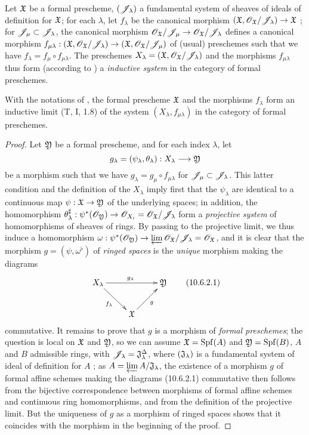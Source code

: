 \begin{env}[10.6.1]
\label{1.10.6.1}
Let $\mathfrak{X}$ be a formal prescheme, $(\mathscr{J}_\lambda)$ a fundamental system of sheaves of ideals of definition for $\mathfrak{X}$; for each $\lambda$, let $f_\lambda$ be the canonical morphism $(\fk{X},\OO_\fk{X}/\sh{J}_\lambda)\to\fk{X}$ ; for $\mathscr{J}_\mu\subset\mathscr{J}_\lambda$, the canonical morphism $\OO_\fk{X}/\sh{J}_\mu\to\OO_\fk{X}/\sh{J}_\lambda$ defines a canonical morphism
$f_{\mu\lambda}:(\fk{X},\OO_\fk{X}/\sh{J}_\lambda)\to(\fk{X},\OO_\fk{X}/\sh{J}_\mu)$ of (usual) preschemes such that we have $f_\lambda=f_\mu\circ f_{\mu\lambda}$.
The preschemes $X_\lambda=(\mathfrak{X},\mathscr{O}_\mathfrak{X}/\mathscr{J}_\lambda)$ and the morphisms $f_{\mu\lambda}$ thus form (according to ) a \emph{inductive system} in the category of formal preschemes.
\end{env}

\begin{prop}[10.6.2]
\label{1.10.6.2}
With the notations of , the formal prescheme $\mathfrak{X}$ and the morphisms $f_\lambda$ form an inductive limit (T, I, 1.8) of the system $(X_\lambda,f_{\mu\lambda})$ in the category of formal preschemes.
\end{prop}

\begin{proof}
\label{proof-1.10.6.2}
Let $\mathfrak{Y}$ be a formal prescheme, and for each index $\lambda$, let
\[
  g_\lambda=(\psi_\lambda,\theta_\lambda):X_\lambda\to\fk{Y}
\]
be a morphism such that we have $g_\lambda=g_\mu\circ f_{\mu\lambda}$ for $\mathscr{J}_\mu\subset\mathscr{J}_\lambda$.
This latter condition and the definition of the $X_\lambda$ imply first that the $\psi_\lambda$ are identical to a continuous map $\psi:\fk{X}\to\fk{Y}$ of the underlying spaces; in addition, the homomorphism $\theta_\lambda^\sharp:\psi^*(\OO_\fk{Y})\to\OO_{X_i}=\OO_\fk{X}/\sh{J}_\lambda$ form a \emph{projective system} of homomorphisms of sheaves of rings.
By passing to the projective limit, we thus induce a homomorphism $\omega:\psi^*(\OO_\fk{Y})\to\varprojlim\OO_\fk{X}/\sh{J}_\lambda=\OO_\fk{X}$, and it is clear that the morphism $g=(\psi,\omega^\flat)$ of \emph{ringed spaces} is the \emph{unique} morphism making the diagrams
\[
  \xymatrix{
    X_\lambda\ar[rr]^{g_\lambda}\ar[rd]_{f_\lambda} & &
    \fk{Y}\\
    & \fk{X}\ar[ru]_g
  }
  \tag{10.6.2.1}
\]
commutative.
It remains to prove that $g$ is a morphism of \emph{formal preschemes}; the question is local on $\mathfrak{X}$ and $\mathfrak{Y}$, so we can assume $\mathfrak{X}={\mathop{\mathrm{Spf}}\nolimits}(A)$ and $\mathfrak{Y}={\mathop{\mathrm{Spf}}\nolimits}(B)$, $A$ and $B$ admissible rings, with $\mathscr{J}_\lambda=\mathfrak{J}_\lambda^\Delta$, where $(\mathfrak{J}_\lambda)$ is a fundamental system of ideal of definition for $A$ ; as $A=\varprojlim A/\mathfrak{J}_\lambda$, the existence of a morphism $g$ of formal affine schemes making the diagrams (10.6.2.1) commutative then follows from the bijective correspondence  between morphisms of formal affine schemes and continuous ring homomorphisms, and from the definition of the projective limit.
But the uniqueness of $g$ as a morphism of ringed spaces shows that it coincides with the morphism in the beginning of the proof.
\end{proof}

